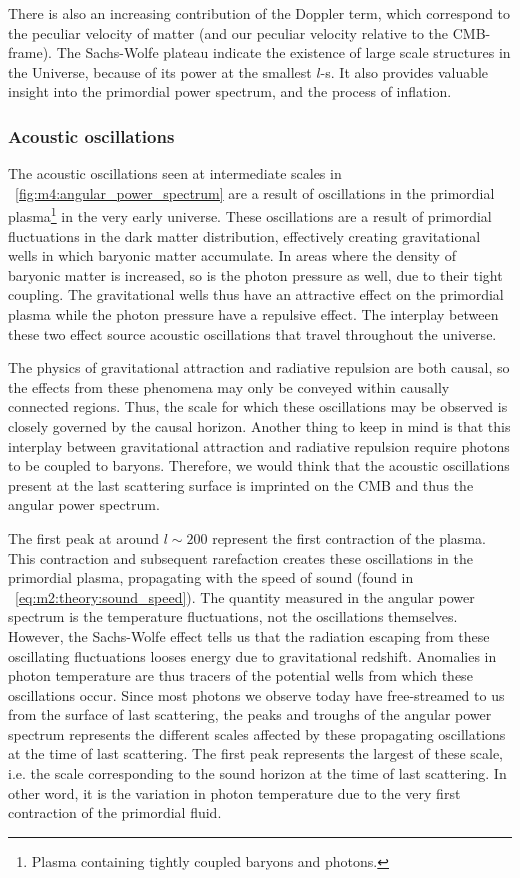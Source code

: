         There is also an increasing contribution of the Doppler term, which correspond to the peculiar velocity of matter (and our peculiar velocity relative to the CMB-frame). The Sachs-Wolfe plateau indicate the existence of large scale structures in the Universe, because of its power at the smallest $l$-s. It also provides valuable insight into the primordial power spectrum, and the process of inflation. 

    \subsubsection{Acoustic oscillations}
        The acoustic oscillations seen at intermediate scales in ~\cref{fig:m4:angular_power_spectrum} are a result of oscillations in the primordial plasma\footnote{Plasma containing tightly coupled baryons and photons.} in the very early universe. These oscillations are a result of primordial fluctuations in the dark matter distribution, effectively creating gravitational wells in which baryonic matter accumulate. In areas where the density of baryonic matter is increased, so is the photon pressure as well, due to their tight coupling. The gravitational wells thus have an attractive effect on the primordial plasma while the photon pressure have a repulsive effect. The interplay between these two effect source acoustic oscillations that travel throughout the universe. 

        The physics of gravitational attraction and radiative repulsion are both causal, so the effects from these phenomena may only be conveyed within causally connected regions. Thus, the scale for which these oscillations may be observed is closely governed by the causal horizon. Another thing to keep in mind is that this interplay between gravitational attraction and radiative repulsion require photons to be coupled to baryons. Therefore, we would think that the acoustic oscillations present at the last scattering surface is imprinted on the CMB and thus the angular power spectrum.

        The first peak at around $l\sim200$ represent the first contraction of the plasma. This contraction and subsequent rarefaction creates these oscillations in the primordial plasma, propagating with the speed of sound (found in ~\cref{eq:m2:theory:sound_speed}). The quantity measured in the angular power spectrum is the temperature fluctuations, not the oscillations themselves. However, the Sachs-Wolfe effect tells us that the radiation escaping from these oscillating fluctuations looses energy due to gravitational redshift. Anomalies in photon temperature are thus tracers of the potential wells from which these oscillations occur. Since most photons we observe today have free-streamed to us from the surface of last scattering, the peaks and troughs of the angular power spectrum represents the different scales affected by these propagating oscillations at the time of last scattering. The first peak represents the largest of these scale, i.e. the scale corresponding to the sound horizon at the time of last scattering. In other word, it is the variation in photon temperature due to the very first contraction of the primordial fluid. 

